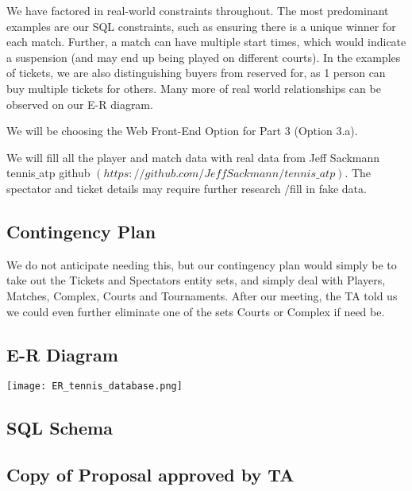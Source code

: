 \documentclass[11pt]{article}
\begin{document}
\begin{enumerate}
We have factored in real-world constraints throughout. The most predominant examples are our SQL constraints, such as ensuring there is a unique winner for each match. Further, a match can have multiple start times, which would indicate a suspension (and may end up being played on different courts). In the examples of tickets, we are also distinguishing buyers from reserved for, as 1 person can buy multiple tickets for others. Many more of real world relationships can be observed on our E-R diagram.

We will be choosing the Web Front-End Option for Part 3 (Option 3.a).

We will fill all the player and match data with real data from Jeff Sackmann tennis$\_$atp github $(https://github.com/JeffSackmann/tennis\_atp)$. The spectator and ticket details may require further research $/$fill in fake data.
\end{enumerate}


\subsection*{Contingency Plan}
We do not anticipate needing this, but our contingency plan would simply be to take out the Tickets and Spectators entity sets, and simply deal with Players, Matches, Complex, Courts and Tournaments. After our meeting, the TA told us we could even further eliminate one of the sets Courts or Complex if need be.

\newpage
\subsection*{E-R Diagram}
\texttt{[image: ER\_tennis\_database.png]}

\newpage
\subsection*{SQL Schema}


\newpage
\subsection*{Copy of Proposal approved by TA}
\begin{mdframed}
\end{mdframed}


\end{document}
